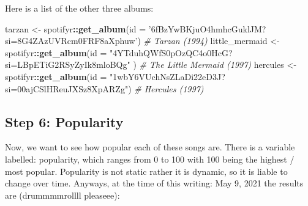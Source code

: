 \documentclass[
]{article}
\newenvironment{Shaded}{\begin{snugshade}}{\end{snugshade}}
\newcommand{\CommentTok}[1]{\textcolor[rgb]{0.56,0.35,0.01}{\textit{#1}}}
\newcommand{\DataTypeTok}[1]{\textcolor[rgb]{0.13,0.29,0.53}{#1}}
\newcommand{\DecValTok}[1]{\textcolor[rgb]{0.00,0.00,0.81}{#1}}
\newcommand{\KeywordTok}[1]{\textcolor[rgb]{0.13,0.29,0.53}{\textbf{#1}}}
\newcommand{\NormalTok}[1]{#1}
\newcommand{\OperatorTok}[1]{\textcolor[rgb]{0.81,0.36,0.00}{\textbf{#1}}}
\newcommand{\StringTok}[1]{\textcolor[rgb]{0.31,0.60,0.02}{#1}}
\begin{document}
Here is a list of the other three albums:

\begin{Shaded}
\begin{Highlighting}[]
\NormalTok{tarzan <-}\StringTok{ }\NormalTok{spotifyr}\OperatorTok{::}\KeywordTok{get_album}\NormalTok{(}\DataTypeTok{id =} \StringTok{'6fBzYwBKjuO4hmhcGuklJM?si=8G4ZAzUVRcm0FRF8aXphuw'}\NormalTok{) }\CommentTok{# Tarzan (1994)}
\NormalTok{little_mermaid <-}\StringTok{ }\NormalTok{spotifyr}\OperatorTok{::}\KeywordTok{get_album}\NormalTok{(}\DataTypeTok{id =} \StringTok{"4YTduhQWfS0pOzQC4o0HcG?si=LBpETiG2RSyZyIk8mloBQg"}\NormalTok{ ) }\CommentTok{# The Little Mermaid (1997)}
\NormalTok{hercules <-}\StringTok{ }\NormalTok{spotifyr}\OperatorTok{::}\KeywordTok{get_album}\NormalTok{(}\DataTypeTok{id =} \StringTok{"1wbY6VUchNsZLaDi22eD3J?si=00ajCSlHReuJXSz8XpARZg"}\NormalTok{) }\CommentTok{# Hercules (1997)}
\end{Highlighting}
\end{Shaded}

\hypertarget{step-6-popularity}{%
\subsection{Step 6: Popularity}\label{step-6-popularity}}

Now, we want to see how popular each of these songs are. There is a
variable labelled: popularity, which ranges from 0 to 100 with 100 being
the highest / most popular. Popularity is not static rather it is
dynamic, so it is liable to change over time. Anyways, at the time of
this writing: May 9, 2021 the results are (drummmmrollll pleaseee):

\begin{Shaded}
\end{Shaded}
\end{document}
